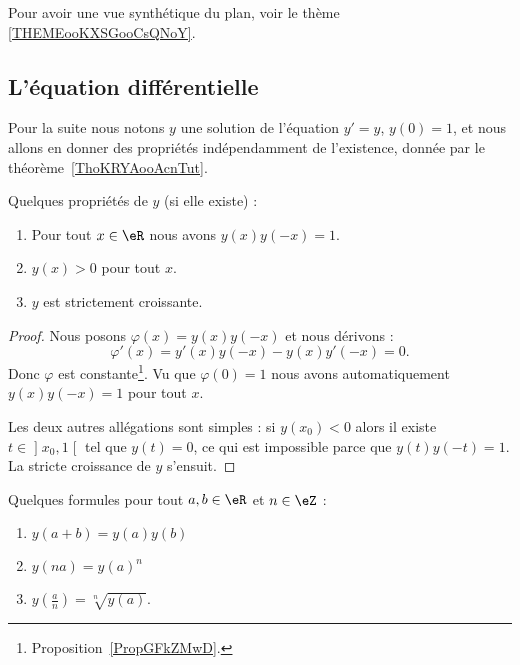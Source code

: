 Pour avoir une vue synthétique du plan, voir le thème \ref{THEMEooKXSGooCsQNoY}.

\subsection{L'équation différentielle}

Pour la suite nous notons \( y\) une solution de l'équation \( y'=y\), \( y(0)=1\), et nous allons en donner des propriétés indépendamment de l'existence, donnée par le théorème~\ref{ThoKRYAooAcnTut}.

\begin{proposition} \label{PropTLECooEiLbPP}
    Quelques propriétés de \( y\) (si elle existe) :
    \begin{enumerate}
        \item
            Pour tout \( x\in \eR\) nous avons \( y(x)y(-x)=1\).
        \item
            \( y(x)>0\) pour tout \( x\).
        \item
            \( y\) est strictement croissante.
    \end{enumerate}
\end{proposition}

\begin{proof}
    Nous posons \( \varphi(x)=y(x)y(-x)\) et nous dérivons :
    \begin{equation}
        \varphi'(x)=y'(x)y(-x)-y(x)y'(-x)=0.
    \end{equation}
    Donc \( \varphi\) est constante\footnote{Proposition~\ref{PropGFkZMwD}.}. Vu que \( \varphi(0)=1\) nous avons automatiquement \( y(x)y(-x)=1\) pour tout \( x\).

Les deux autres allégations sont simples : si \( y(x_0)<0\) alors il existe \( t\in\mathopen] x_0 , 1 \mathclose[\) tel que \( y(t)=0\), ce qui est impossible parce que \( y(t)y(-t)=1\). La stricte croissance de \( y\) s'ensuit.
\end{proof}

\begin{proposition}     \label{PROPooGGUIooExVHPM}
    Quelques formules pour tout \( a,b\in \eR\) et \( n\in \eZ\) :
    \begin{enumerate}
        \item       \label{ITEMooMPSUooWQpVQJ}
            \( y(a+b)=y(a)y(b)\)
        \item
            \( y(na)=y(a)^n\)
        \item
            \( y\left( \frac{ a }{ n } \right)=\sqrt[n]{y(a)}\).
    \end{enumerate}
\end{proposition}


